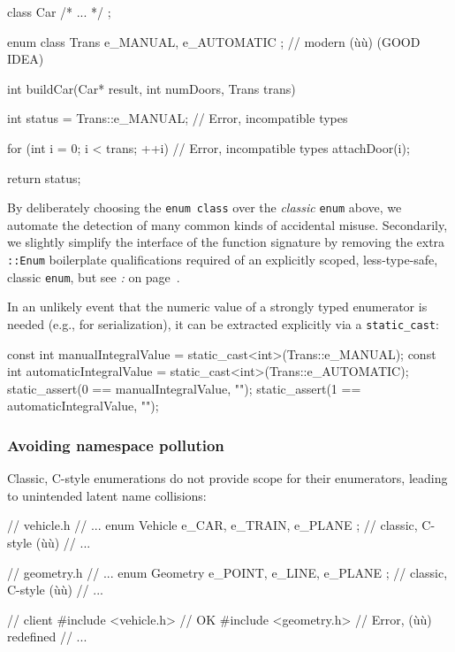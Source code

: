 \begin{emcppslisting}
class Car { /* ... */ };

enum class Trans { e_MANUAL, e_AUTOMATIC };  // modern (ù{}ù) (GOOD IDEA)

int buildCar(Car* result, int numDoors, Trans trans)
{
    int status = Trans::e_MANUAL;    // Error, incompatible types

    for (int i = 0; i < trans; ++i)  // Error, incompatible types
    {
         attachDoor(i);
    }

    return status;
}
\end{emcppslisting}

\noindent By deliberately choosing the \texttt{enum}~\texttt{class} over the
\emph{classic} \texttt{enum} above, we automate the detection of many common
kinds of accidental misuse. Secondarily, we slightly simplify the interface of the function signature by removing the extra \texttt{::Enum} boilerplate qualifications required of an explicitly
scoped, less-type-safe, classic \texttt{enum}, but see \textit{: } on page~\pageref{strong-typing-of-an-enum-class-can-be-counterproductive}.

In an unlikely event that the numeric value of a strongly typed
enumerator is needed (e.g., for serialization), it can be extracted
explicitly via a \texttt{static\_cast}:

\begin{emcppslisting}
const int manualIntegralValue    = static_cast<int>(Trans::e_MANUAL);
const int automaticIntegralValue = static_cast<int>(Trans::e_AUTOMATIC);
static_assert(0 == manualIntegralValue,    "");
static_assert(1 == automaticIntegralValue, "");
\end{emcppslisting}

\subsubsection[Avoiding namespace pollution]{Avoiding namespace pollution}\label{avoiding-namespace-pollution}

Classic, C-style enumerations do not provide scope for their
enumerators, leading to unintended latent name collisions:

\begin{emcppslisting}
// vehicle.h
// ...
enum Vehicle  { e_CAR, e_TRAIN, e_PLANE };  // classic, C-style (ù{}ù)
// ...

// geometry.h
// ...
enum Geometry { e_POINT, e_LINE,  e_PLANE };  // classic, C-style (ù{}ù)
// ...

// client
#include <vehicle.h>  // OK
#include <geometry.h> // Error, (ù{}ù) redefined
// ...
\end{emcppslisting}

